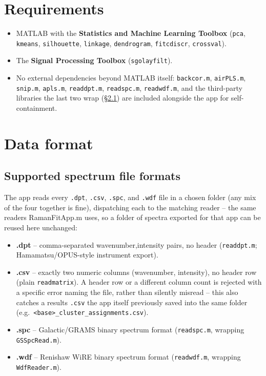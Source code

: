 \documentclass[11pt,a4paper]{article}
\newcommand{\code}[1]{\texttt{#1}}
\begin{document}
\section{Requirements}
\begin{itemize}
  \item MATLAB with the \textbf{Statistics and Machine Learning Toolbox}
  (\code{pca}, \code{kmeans}, \code{silhouette}, \code{linkage},
  \code{dendrogram}, \code{fitcdiscr}, \code{crossval}).
  \item The \textbf{Signal Processing Toolbox} (\code{sgolayfilt}).
  \item No external dependencies beyond MATLAB itself: \code{backcor.m},
  \code{airPLS.m}, \code{snip.m}, \code{apls.m}, \code{readdpt.m},
  \code{readspc.m}, \code{readwdf.m}, and the third-party libraries the
  last two wrap (\S\ref{sec:fileformats}) are included alongside the app
  for self-containment.
\end{itemize}

\section{Data format}
\subsection{Supported spectrum file formats}
\label{sec:fileformats}
The app reads every \code{.dpt}, \code{.csv}, \code{.spc}, and \code{.wdf}
file in a chosen folder (any mix of the four together is fine), dispatching
each to the matching reader -- the same readers RamanFitApp.m uses, so a
folder of spectra exported for that app can be reused here unchanged:

\begin{itemize}
  \item \textbf{.dpt} -- comma-separated wavenumber,intensity pairs, no
  header (\code{readdpt.m}; Hamamatsu/OPUS-style instrument export).
  \item \textbf{.csv} -- exactly two numeric columns (wavenumber,
  intensity), no header row (plain \code{readmatrix}). A header row or a
  different column count is rejected with a specific error naming the
  file, rather than silently misread -- this also catches a results
  \code{.csv} the app itself previously saved into the same folder (e.g.\
  \code{<base>\_cluster\_assignments.csv}).
  \item \textbf{.spc} -- Galactic/GRAMS binary spectrum format
  (\code{readspc.m}, wrapping \code{GSSpcRead.m}).
  \item \textbf{.wdf} -- Renishaw WiRE binary spectrum format
  (\code{readwdf.m}, wrapping \code{WdfReader.m}).
\end{itemize}
\end{document}
